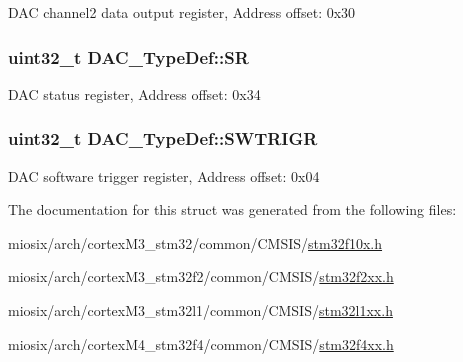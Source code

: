 D\-A\-C channel2 data output register, Address offset\-: 0x30 \hypertarget{struct_d_a_c___type_def_a1d3fd83d6ed8b2d90b471db4509b0e70}{
\subsubsection[{S\-R}]{ uint32\-\_\-t D\-A\-C\-\_\-\-Type\-Def\-::\-S\-R}}\label{struct_d_a_c___type_def_a1d3fd83d6ed8b2d90b471db4509b0e70}
D\-A\-C status register, Address offset\-: 0x34 \hypertarget{struct_d_a_c___type_def_a4ccb66068a1ebee1179574dda20206b6}{
\subsubsection[{S\-W\-T\-R\-I\-G\-R}]{ uint32\-\_\-t D\-A\-C\-\_\-\-Type\-Def\-::\-S\-W\-T\-R\-I\-G\-R}}\label{struct_d_a_c___type_def_a4ccb66068a1ebee1179574dda20206b6}
D\-A\-C software trigger register, Address offset\-: 0x04 

The documentation for this struct was generated from the following files\-:\begin{DoxyCompactItemize}
\item 
miosix/arch/cortex\-M3\-\_\-stm32/common/\-C\-M\-S\-I\-S/\hyperlink{stm32f10x_8h}{stm32f10x.\-h}\item 
miosix/arch/cortex\-M3\-\_\-stm32f2/common/\-C\-M\-S\-I\-S/\hyperlink{stm32f2xx_8h}{stm32f2xx.\-h}\item 
miosix/arch/cortex\-M3\-\_\-stm32l1/common/\-C\-M\-S\-I\-S/\hyperlink{stm32l1xx_8h}{stm32l1xx.\-h}\item 
miosix/arch/cortex\-M4\-\_\-stm32f4/common/\-C\-M\-S\-I\-S/\hyperlink{stm32f4xx_8h}{stm32f4xx.\-h}\end{DoxyCompactItemize}
